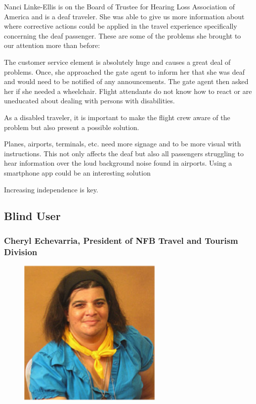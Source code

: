 \documentclass[a4paper, 12pt,conference]{new_cit_thesis}
\begin{document}
Nanci Linke-Ellis is on the Board of Trustee for Hearing Loss Association of America and is a deaf traveler. She was able to give us more information about where corrective actions could be applied in the travel experience specifically concerning the deaf passenger. These are some of the problems she brought to our attention more than before:

\begin{list}{-}{}
  \item The customer service element is absolutely huge and causes a great deal of problems. Once, she approached the gate agent to inform her that she was deaf and would need to be notified of any announcements. The gate agent then asked her if she needed a wheelchair. Flight attendants do not know how to react or are uneducated about dealing with persons with disabilities. 
  \item As a disabled traveler, it is important to make the flight crew aware of the problem but also present a possible solution. 
  \item Planes, airports, terminals, etc. need more signage and to be more visual with instructions. This not only affects the deaf but also all passengers struggling to hear information over the loud background noise found in airports. Using a smartphone app could be an interesting solution
  \item Increasing independence is key. 
\end{list}

\subsection*{Blind User}
\subsubsection{Cheryl Echevarria, President of NFB Travel and Tourism Division}
\begin{figure}[h]
  \centering
     \includegraphics[width=7cm]{images/image028}
  \label{fig:28}
\end{figure}
\end{document}
